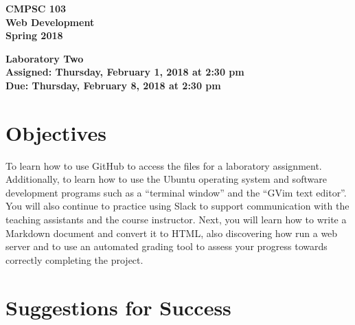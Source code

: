 \documentclass[11pt]{article}
\newcommand{\assignmentduedate}{February 8}
\newcommand{\assignmentassignedate}{February 1}
\newcommand{\assignmentnumber}{Two}
\newcommand{\labyear}{2018}
\newcommand{\labday}{Thursday}
\newcommand{\labtime}{2:30 pm}
\newcommand{\assigneddate}{Assigned: \labday, \assignmentassignedate, \labyear{} at \labtime{}}
\newcommand{\duedate}{Due: \labday, \assignmentduedate, \labyear{} at \labtime{}}
\newcommand{\labtitle}[1]
{
  \begin{center}
    \begin{center}
      \bf
      CMPSC 103\\Web Development\\
      Spring 2018\\
      \medskip
    \end{center}
    \bf
    #1
  \end{center}
}
\begin{document}
\thispagestyle{empty}

\labtitle{Laboratory \assignmentnumber{} \\ \assigneddate{} \\ \duedate{}}

\section*{Objectives}

To learn how to use GitHub to access the files for a laboratory assignment. Additionally, to learn how to use the Ubuntu
operating system and software development programs such as a ``terminal window'' and the ``GVim text editor''. You will
also continue to practice using Slack to support communication with the teaching assistants and the course instructor.
Next, you will learn how to write a Markdown document and convert it to HTML, also discovering how run a web server and
to use an automated grading tool to assess your progress towards correctly completing the project.

\section*{Suggestions for Success}
\end{document}

